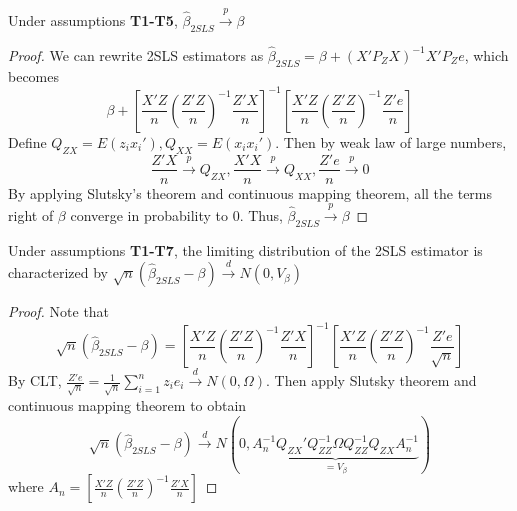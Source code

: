 \begin{mdframed}[backgroundcolor=green!5] 
\begin{theorem} Under assumptions \textbf{T1-T5}, $\hat{\beta}_{2SLS}\xrightarrow{p}\beta$
\begin{proof}
We can rewrite 2SLS estimators as $\hat{\beta}_{2SLS}=\beta+(X'P_ZX)^{-1}X'P_Ze$, which becomes
\small{\[
\beta+\left[\frac{X'Z}{n}\left(\frac{Z'Z}{n}\right)^{-1} \frac{Z'X}{n}\right]^{-1}\left[\frac{X'Z}{n}\left(\frac{Z'Z}{n}\right)^{-1} \frac{Z'e}{n}\right]
\]}\normalsize
Define $Q_{ZX}=E(z_ix_i'), Q_{XX}=E(x_ix_i')$. Then by weak law of large numbers,
\small{\[
\frac{Z'X}{n}\xrightarrow{p}Q_{ZX}, \frac{X'X}{n}\xrightarrow{p}Q_{XX}, \frac{Z'e}{n}\xrightarrow{p}0
\]}\normalsize
By applying Slutsky's theorem and continuous mapping theorem, all the terms right of $\beta$ converge in probability to 0. Thus, $\hat{\beta}_{2SLS}\xrightarrow{p}\beta$
\end{proof}
\end{theorem}
\begin{theorem} Under assumptions \textbf{T1-T7}, the limiting distribution of the 2SLS estimator is characterized by $\sqrt{n}(\hat{\beta}_{2SLS}-\beta)\xrightarrow{d}N(0,V_\beta)$
\begin{proof}
Note that
\small{\[
\sqrt{n}(\hat{\beta}_{2SLS}-\beta)=\left[\frac{X'Z}{n}\left(\frac{Z'Z}{n}\right)^{-1} \frac{Z'X}{n}\right]^{-1}\left[\frac{X'Z}{n}\left(\frac{Z'Z}{n}\right)^{-1} \frac{Z'e}{\sqrt{n}}\right]
\]}\normalsize
By CLT, $\frac{Z'e}{\sqrt{n}}=\frac{1}{\sqrt{n}}\sum_{i=1}^nz_ie_i\xrightarrow{d}N(0,\Omega)$. Then apply Slutsky theorem and continuous mapping theorem to obtain
\small{\[
\sqrt{n}(\hat{\beta}_{2SLS}-\beta)\xrightarrow{d}N(0,\underbrace{A_n^{-1}Q_{ZX}'Q_{ZZ}^{-1}\Omega Q_{ZZ}^{-1}Q_{ZX}A_n^{-1}}_{=V_\beta})
\]}\normalsize
where $A_n=\left[\frac{X'Z}{n}\left(\frac{Z'Z}{n}\right)^{-1} \frac{Z'X}{n}\right]$
\end{proof}
\end{theorem}
\end{mdframed}

